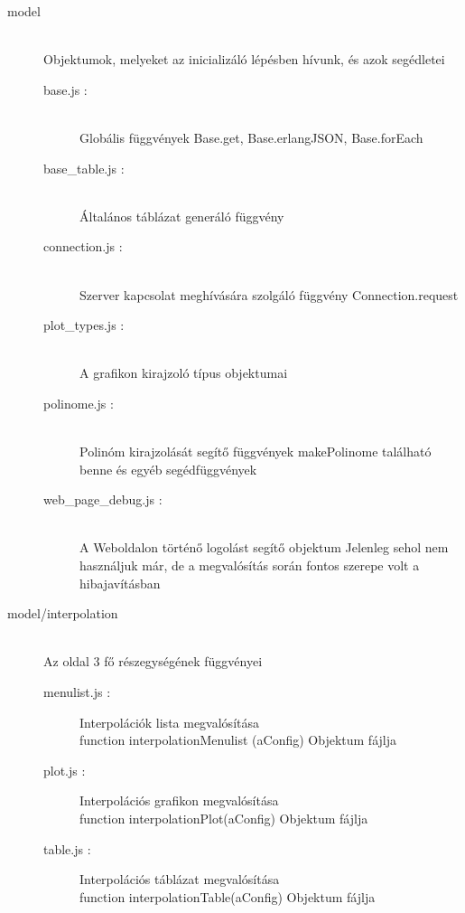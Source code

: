 \begin{description}
		\item[model] 
		\hfill \\ Objektumok, melyeket az inicializáló lépésben hívunk, és azok segédletei
		\begin{description}
		 	\item[base.js : ] 
		 		\hfill \\ Globális függvények \newline
		 		Base.get, Base.erlangJSON, Base.forEach
		 	\item[base\_table.js : ] 
		 		\hfill \\
		 		Általános táblázat generáló függvény
		 	\item[connection.js : ] 
		 		\hfill \\Szerver kapcsolat meghívására szolgáló függvény \newline
		 		 Connection.request
		 	\item[plot\_types.js : ]
		 		\hfill \\ A grafikon kirajzoló típus objektumai
		 	\item[polinome.js : ] 
		 		\hfill \\  
		 		Polinóm kirajzolását segítő függvények \newline
		 		makePolinome található benne és egyéb segédfüggvények
		 	\item[web\_page\_debug.js : ] 
		 		\hfill \\ 
		 		A Weboldalon történő logolást segítő objektum
		 		\newline Jelenleg sehol nem használjuk már, de a megvalósítás során fontos szerepe volt a hibajavításban
		\end{description}
		\item[model/interpolation] 
		\hfill \\ Az oldal 3 fő részegységének függvényei
			\begin{description}
			\item[menulist.js : ] Interpolációk lista megvalósítása
			\hfill \\  function interpolationMenulist (aConfig) Objektum fájlja
		  	\item[plot.js : ] Interpolációs grafikon megvalósítása
			\hfill \\  function interpolationPlot(aConfig) Objektum fájlja
			\item[table.js : ] Interpolációs táblázat megvalósítása
			\hfill \\  function interpolationTable(aConfig) Objektum fájlja
			\end{description}
	\end{description}
